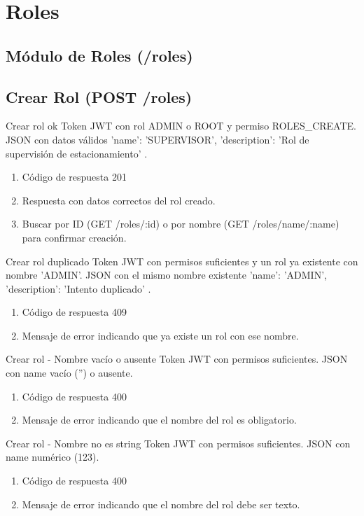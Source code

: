 \section{Roles}
\subsection{Módulo de Roles (/roles)}

\subsection{Crear Rol (POST /roles)}

{Crear rol ok}
{Token JWT con rol ADMIN o ROOT y permiso ROLES\_CREATE.}
{JSON con datos válidos { 'name': 'SUPERVISOR', 'description': 'Rol de supervisión de estacionamiento' }.}
{\begin{enumerate} [leftmargin=*, nosep]
    \item Código de respuesta 201
    \item Respuesta con datos correctos del rol creado.
    \item Buscar por ID (GET /roles/:id) o por nombre (GET /roles/name/:name) para confirmar creación.
\end{enumerate}}

{Crear rol duplicado}
{Token JWT con permisos suficientes y un rol ya existente con nombre 'ADMIN'.}
{JSON con el mismo nombre existente { 'name': 'ADMIN', 'description': 'Intento duplicado' }.}
{\begin{enumerate} [leftmargin=*, nosep]
    \item Código de respuesta 409
    \item Mensaje de error indicando que ya existe un rol con ese nombre.
\end{enumerate}}

{Crear rol - Nombre vacío o ausente}
{Token JWT con permisos suficientes.}
{JSON con name vacío ('') o ausente.}
{\begin{enumerate} [leftmargin=*, nosep]
    \item Código de respuesta 400
    \item Mensaje de error indicando que el nombre del rol es obligatorio.
\end{enumerate}}

{Crear rol - Nombre no es string}
{Token JWT con permisos suficientes.}
{JSON con name numérico (123).}
{\begin{enumerate} [leftmargin=*, nosep]
    \item Código de respuesta 400
    \item Mensaje de error indicando que el nombre del rol debe ser texto.
\end{enumerate}}

